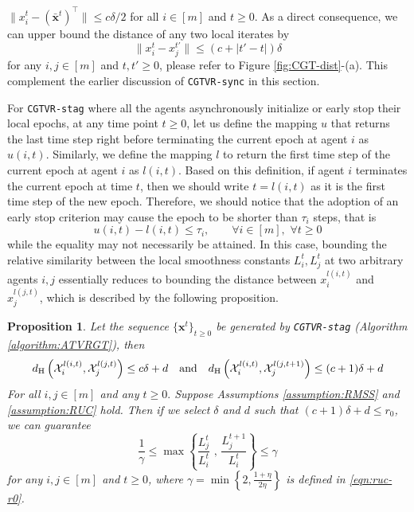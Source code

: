 \documentclass{article}
\newtheorem{proposition}[theorem]{Proposition}
\newcommand{\cX}{\mathcal{X}}
\newcommand{\bxt}{\mathbf{x}^t}
\newcommand{\bbxt}{\bar{\mathbf{x}}^t}
\begin{document}
$\|x_i^t - (\bbxt)^\top\| \leq c\delta/2$ for all $i\in[m]$ and $t\geq0$. As a direct consequence, we can upper bound the distance of any two local iterates by 
\begin{equation}
    \label{eqn:local-iter-dist}
    \|x_i^t-x_j^{t'}\| \leq (c+|t'-t|)\delta
\end{equation}
for any $i,j\in[m]$ and $t,t'\geq0$, please refer to Figure \ref{fig:CGT-dist}-(a). This complement the earlier discussion of \texttt{CGTVR-sync} in this section. 

For \texttt{CGTVR-stag} where all the agents asynchronously initialize or early stop their local epochs, at any time point $t\geq0$, let us define the mapping $u$ that returns the last time step right before terminating the current epoch at agent $i$ as $u(i,t)$. Similarly, we define the mapping $l$ to return the first time step of the current epoch at agent $i$ as $l(i,t)$. Based on this definition, if agent $i$ terminates the current epoch at time $t$, then we should write $t = l(i,t)$ as it is the first time step of the new epoch. Therefore, we should notice that the adoption of an early stop criterion may cause the epoch to be shorter than $\tau_i$ steps, that is
$$u(i,t)-l(i,t)\leq \tau_i, \qquad \forall i\in[m],\,\,\forall t\geq0$$
while the equality may not necessarily be attained. In this case, bounding the relative similarity between the local smoothness constants $L_i^t,L_j^t$ at two arbitrary agents $i,j$ essentially reduces to bounding the distance between $x_i^{l(i,t)}$ and $x_j^{l(j,t)}$, which is described by the following proposition.  
\begin{proposition}
    \label{proposition:stager-dist-bound}
    Let the sequence $\{\bxt\}_{t\geq0}$ be generated by \texttt{CGTVR-stag} (Algorithm \ref{algorithm:ATVRGT}), then 
    $$d_{\rm H}\left(\cX_i^{l(i,t)},\cX_j^{l(j,t)}\right) \leq c\delta+d  \quad\mbox{and}\quad d_{\rm H}\left(\cX_i^{l(i,t)},\cX_j^{l(j,t+1)}\right)\leq (c+1)\delta+d$$
    For all $i,j\in[m]$ and any $ t\geq0.$
    Suppose Assumptions \ref{assumption:RMSS} and \ref{assumption:RUC} hold. Then if we select $\delta$ and $d$ such that $(c+1)\delta+d\leq r_0$, we can guarantee  
    $$\frac{1}{\gamma}\leq  \max\left\{\frac{L_j^t}{L_i^t}\,\,,\, \frac{L_j^{t+1}}{L_i^t}\right\}\leq \gamma$$
    for any $i,j\in[m]$ and $t\geq0$, where $\gamma = \min\left\{2,\frac{1+\eta}{2\eta}\right\}$ is defined in \eqref{eqn:ruc-r0}.
\end{proposition}
\end{document}
